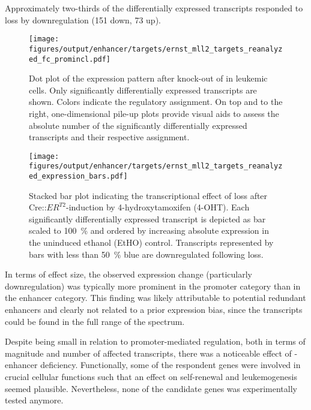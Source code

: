 Approximately two-thirds of the differentially expressed transcripts responded to  loss by downregulation (\num{151} down, \num{73} up). 

\begin{figure}[p]
	\vspace{-2em}
	\centering
	\texttt{[image: figures/output/enhancer/targets/ernst\_mll2\_targets\_reanalyzed\_fc\_promincl.pdf]} 
	\caption{Dot plot of the expression pattern after knock-out of   in \mllafnine leukemic cells. Only significantly differentially expressed transcripts are shown. Colors indicate the regulatory assignment. On top and to the right, one-dimensional pile-up plots provide visual aids to assess the absolute number of the significantly differentially expressed transcripts and their respective assignment.}
	\label{fig:enhancers:ernst_mll2_targets_reanalyzed_fc_promincl}
\end{figure}

\begin{figure}[p]
	\centering
	\texttt{[image: figures/output/enhancer/targets/ernst\_mll2\_targets\_reanalyzed\_expression\_bars.pdf]} 
	\caption{Stacked bar plot indicating the transcriptional effect of  loss after Cre::\ensuremath{ER^{T2}}-induction by 4-hydroxytamoxifen (4-OHT). Each significantly differentially expressed transcript is depicted as bar scaled to \SI{100}{\percent} and ordered by increasing absolute expression in the uninduced ethanol (EtHO) control. Transcripts represented by bars with less than  \SI{50}{\percent} blue are downregulated following  loss.}
	\label{fig:enhancers:ernst_mll2_targets_reanalyzed_expression_bars}
\end{figure}

In terms of effect size, the observed expression change (particularly downregulation) was typically more prominent in the promoter category than in the enhancer category. This finding was likely attributable to potential redundant enhancers and clearly not related to a prior expression bias, since the transcripts could be found in the full range of the spectrum.

Despite being small in relation to promoter-mediated regulation, both in terms of magnitude and number of affected transcripts, there was a noticeable effect of -enhancer deficiency. Functionally, some of the respondent genes  were involved in crucial cellular functions such that an effect on self-renewal and leukemogenesis seemed plausible. Nevertheless, none of the candidate genes was experimentally tested anymore. 

